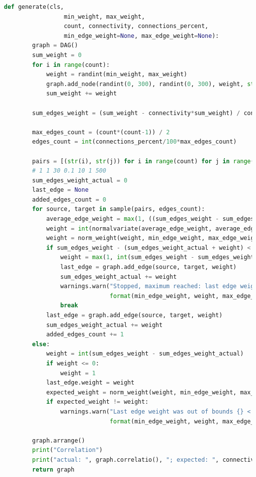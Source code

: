 \begin{lstlisting}[language=Python,caption={Вихідний код генерації випадкового графу задачі},label=lst:random_dag]
    def generate(cls,
                 min_weight, max_weight,
                 count, connectivity, connections_percent,
                 min_edge_weight=None, max_edge_weight=None):
        graph = DAG()
        sum_weight = 0
        for i in range(count):
            weight = randint(min_weight, max_weight)
            graph.add_node(randint(0, 300), randint(0, 300), weight, str(i))
            sum_weight += weight

        sum_edges_weight = (sum_weight - connectivity*sum_weight) / connectivity

        max_edges_count = (count*(count-1)) / 2
        edges_count = int(connections_percent/100*max_edges_count)

        pairs = [(str(i), str(j)) for i in range(count) for j in range(i+1, count)]
        # 1 1 30 0.1 10 1 500
        sum_edges_weight_actual = 0
        last_edge = None
        added_edges_count = 0
        for source, target in sample(pairs, edges_count):
            average_edge_weight = max(1, ((sum_edges_weight - sum_edges_weight_actual) / (edges_count - added_edges_count)))
            weight = int(normalvariate(average_edge_weight, average_edge_weight/4))
            weight = norm_weight(weight, min_edge_weight, max_edge_weight, average_edge_weight)
            if sum_edges_weight - (sum_edges_weight_actual + weight) < 0:
                weight = max(1, int(sum_edges_weight - sum_edges_weight_actual))
                last_edge = graph.add_edge(source, target, weight)
                sum_edges_weight_actual += weight
                warnings.warn("Stopped, maximum reached: last edge weight was {} < {} < {}".
                              format(min_edge_weight, weight, max_edge_weight))
                break
            last_edge = graph.add_edge(source, target, weight)
            sum_edges_weight_actual += weight
            added_edges_count += 1
        else:
            weight = int(sum_edges_weight - sum_edges_weight_actual)
            if weight <= 0:
                weight = 1
            last_edge.weight = weight
            expected_weight = norm_weight(weight, min_edge_weight, max_edge_weight, average_edge_weight)
            if expected_weight != weight:
                warnings.warn("Last edge weight was out of bounds {} < {} < {}".
                              format(min_edge_weight, weight, max_edge_weight))

        graph.arrange()
        print("Correlation")
        print("actual: ", graph.correlatio(), "; expected: ", connectivity)
        return graph


\end{lstlisting}


